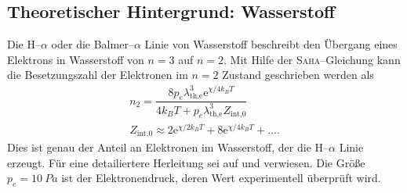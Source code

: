 \subsection{Theoretischer Hintergrund: Wasserstoff}
Die H--$\alpha $ oder die Balmer--$\alpha $ Linie von Wasserstoff beschreibt den Übergang eines Elektrons in Wasserstoff von $n=3$ auf $n=2$.
Mit Hilfe der \textsc{Saha}--Gleichung kann die Besetzungszahl der Elektronen im $n=2$ Zustand geschrieben werden als
\begin{align} 
  n_2=\dfrac{8p_e\lambda _{\text{th,e}}^3\text{e}^{\chi /4k_BT}}{4k_BT+p_e\lambda _{\text{th,e}}^3Z_{\text{int,0}}}\\
  Z_{\text{int,0}}\approx 2\text{e}^{\chi /2k_BT}+8\text{e}^{\chi /4k_BT}+\hdots 
.\end{align} 
Dies ist genau der Anteil an Elektronen im Wasserstoff, der die H--$\alpha $ Linie erzeugt.
Für eine detailiertere Herleitung sei auf \cite{anleitung464} und \cite{saha} verwiesen.
Die Größe $p_e=\SI{10}{Pa}$ ist der Elektronendruck, deren Wert experimentell überprüft wird.
